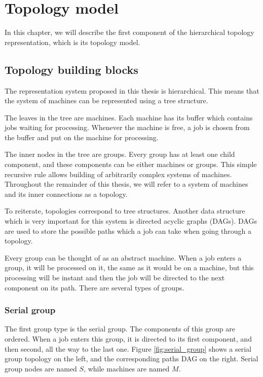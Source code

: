 \chapter{Topology model}
\label{sec:topology_model}

In this chapter, we will describe the first component of the hierarchical topology representation, which is its topology model.

\section{Topology building blocks}
\label{sec:topology_building_blocks}
The representation system proposed in this thesis is hierarchical. This means that the system of machines can be represented using a tree structure.

The leaves in the tree are machines. Each machine has its buffer which contains jobs waiting for processing. Whenever the machine is free, a job is chosen from the buffer and put on the machine for processing.

The inner nodes in the tree are groups. Every group has at least one child component, and these components can be either machines or groups. This simple recursive rule allows building of arbitrarily complex systems of machines. Throughout the remainder of this thesis, we will refer to a system of machines and its inner connections as a topology. 

To reiterate, topologies correspond to tree structures. Another data structure which is very important for this system is directed acyclic graphs (DAGs). DAGs are used to store the possible paths which a job can take when going through a topology.

Every group can be thought of as an abstract machine. When a job enters a group, it will be processed on it, the same as it would be on a machine, but this processing will be instant and then the job will be directed to the next component on its path. There are several types of groups. 

\subsection{Serial group}

The first group type is the serial group. The components of this group are ordered. When a job enters this group, it is directed to its first component, and then second, all the way to the last one. Figure \ref{fig:serial_group} shows a serial group topology on the left, and the corresponding paths DAG on the right. Serial group nodes are named $S$, while machines are named $M$.


